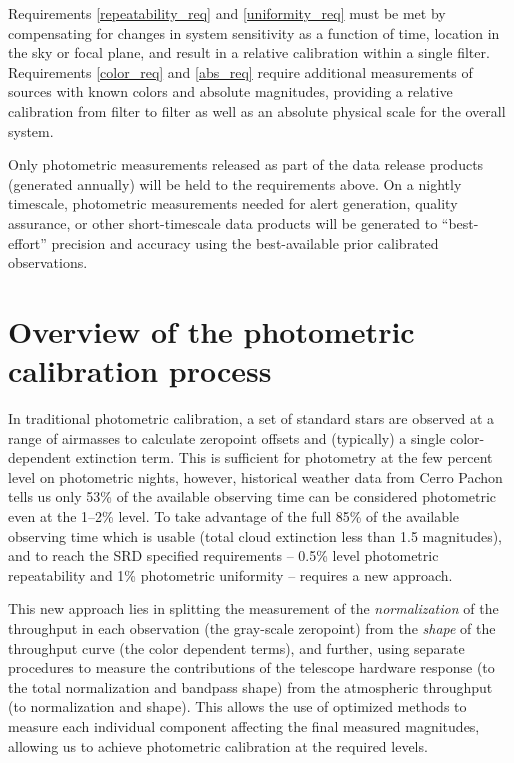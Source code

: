 \documentclass[12pt,preprint]{aastex}
\begin{document}
Requirements \ref{repeatability_req} and \ref{uniformity_req} must be
met by compensating for changes in system sensitivity as a function of
time, location in the sky or focal plane, and result in a relative
calibration within a single filter. Requirements \ref{color_req} and
\ref{abs_req} require additional measurements of sources with known
colors and absolute magnitudes, providing a relative calibration from
filter to filter as well as an absolute physical scale for the overall
system.

Only photometric measurements released as part of the data release
products (generated annually) will be held to the requirements
above. On a nightly timescale, photometric measurements needed for
alert generation, quality assurance, or other short-timescale data
products will be generated to ``best-effort'' precision and accuracy
using the best-available prior calibrated observations.

\section{Overview of the photometric calibration process}
\label{sec:calib_overview}

In traditional photometric calibration, a set of standard stars are
observed at a range of airmasses to calculate zeropoint offsets and
(typically) a single color-dependent extinction term. This is
sufficient for photometry at the few percent level on photometric
nights, however, historical weather data from Cerro Pachon tells us
only 53\% of the available observing time can be considered
photometric even at the 1--2\% level. To take advantage of the full
85\% of the available observing time which is usable (total cloud
extinction less than 1.5 magnitudes), and to reach the SRD specified
requirements -- 0.5\% level photometric repeatability and 1\%
photometric uniformity -- requires a new approach.

This new approach lies in splitting the measurement of the {\it
normalization} of the throughput in each observation (the gray-scale
zeropoint) from the {\it shape} of the throughput curve (the color
dependent terms), and further, using separate procedures to measure
the contributions of the telescope hardware response (to the total
normalization and bandpass shape) from the atmospheric throughput (to
normalization and shape). This allows the use of optimized methods to
measure each individual component affecting the final measured
magnitudes, allowing us to achieve photometric calibration at the
required levels.
\end{document}
